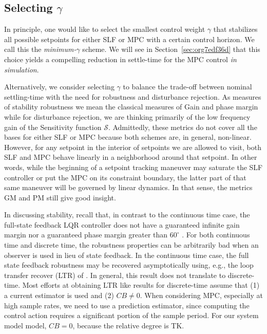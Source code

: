 \documentclass[journal,twocolumn,twoside]{IEEEtran}
\begin{document}
\subsection{Selecting $\gamma$}
In principle, one would like to select the smallest control weight $\gamma$ that stabilizes all possible setpoints for either SLF or MPC with a certain control horizon. We call this the \emph{minimum-$\gamma$} scheme. We will see in Section~\ref{sec:org7edf36d} that this choice yields a compelling reduction in settle-time for the MPC control \emph{in simulation}.

Alternatively, we consider selecting $\gamma$ to balance the trade-off between nominal settling-time with the need for robustness and disturbance rejection. As measures of stability robustness we mean the classical measures of Gain and phase margin while for disturbance rejection, we are thinking primarily of the low frequency gain of the Sensitivity function $\mathcal{S}$. Admittedly, these metrics do not cover all the bases for either SLF or MPC because both schemes are, in general, non-linear. However, for any setpoint in the interior of setpoints we are allowed to visit, both SLF and MPC behave linearly in a neighborhood around that setpoint. In other words, while the beginning of a setpoint tracking maneuver may saturate the SLF controller or put the MPC on its constraint boundary, the latter part of that same maneuver will be governed by linear dynamics. In that sense, the metrics GM and PM still give good insight. %

In discussing stability, recall that, in contrast to the continuous time case, the full-state feedback LQR controller does not have a guaranteed infinite gain margin nor a guaranteed phase margin greater than $60^{\circ}$ \cite{andersson_moore}. For both continuous time and discrete time, the robustness properties can be arbitrarily bad when an observer is used in lieu of state feedback. In the continuous time case, the full state feedback robustness may be recovered asymptotically using, e.g., the loop transfer recover (LTR) of \cite{doyle_guaranteed_1978}. In general, this result does not translate to discrete-time. Most efforts at obtaining LTR like results for discrete-time assume that (1) a current estimator is used and (2) $CB\neq 0$. When considering MPC, especially at high sample rates, we need to use a prediction estimator, since computing the control action requires a significant portion of the sample period. For our system model model, $CB=0$, because the relative degree is TK. 
\end{document}
